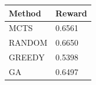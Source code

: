\begin{tabular}{ll}
\hline
Method & Reward \\
\hline
  MCTS & 0.6561 \\
  RANDOM & 0.6650 \\
  GREEDY & 0.5398 \\
  GA & 0.6497 \\
\hline
\end{tabular}
